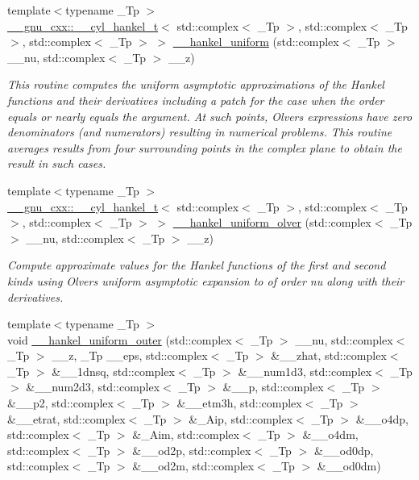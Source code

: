 \begin{DoxyCompactItemize}
{\footnotesize template$<$typename \+\_\+\+Tp $>$ }\\\hyperlink{struct____gnu__cxx_1_1____cyl__hankel__t}{\+\_\+\+\_\+gnu\+\_\+cxx\+::\+\_\+\+\_\+cyl\+\_\+hankel\+\_\+t}$<$ std\+::complex$<$ \+\_\+\+Tp $>$, std\+::complex$<$ \+\_\+\+Tp $>$, std\+::complex$<$ \+\_\+\+Tp $>$ $>$ \hyperlink{namespacestd_1_1____detail_a4de129af45576a92a42fa2b7fc2d17f3}{\+\_\+\+\_\+hankel\+\_\+uniform} (std\+::complex$<$ \+\_\+\+Tp $>$ \+\_\+\+\_\+nu, std\+::complex$<$ \+\_\+\+Tp $>$ \+\_\+\+\_\+z)
\begin{DoxyCompactList}\small\item\em This routine computes the uniform asymptotic approximations of the Hankel functions and their derivatives including a patch for the case when the order equals or nearly equals the argument. At such points, Olver\textquotesingle{}s expressions have zero denominators (and numerators) resulting in numerical problems. This routine averages results from four surrounding points in the complex plane to obtain the result in such cases. \end{DoxyCompactList}\item 
{\footnotesize template$<$typename \+\_\+\+Tp $>$ }\\\hyperlink{struct____gnu__cxx_1_1____cyl__hankel__t}{\+\_\+\+\_\+gnu\+\_\+cxx\+::\+\_\+\+\_\+cyl\+\_\+hankel\+\_\+t}$<$ std\+::complex$<$ \+\_\+\+Tp $>$, std\+::complex$<$ \+\_\+\+Tp $>$, std\+::complex$<$ \+\_\+\+Tp $>$ $>$ \hyperlink{namespacestd_1_1____detail_abbd697ee381eb2e489caa077ba7b00d9}{\+\_\+\+\_\+hankel\+\_\+uniform\+\_\+olver} (std\+::complex$<$ \+\_\+\+Tp $>$ \+\_\+\+\_\+nu, std\+::complex$<$ \+\_\+\+Tp $>$ \+\_\+\+\_\+z)
\begin{DoxyCompactList}\small\item\em Compute approximate values for the Hankel functions of the first and second kinds using Olver\textquotesingle{}s uniform asymptotic expansion to of order {\ttfamily nu} along with their derivatives. \end{DoxyCompactList}\item 
{\footnotesize template$<$typename \+\_\+\+Tp $>$ }\\void \hyperlink{namespacestd_1_1____detail_a099751f2a153283d91f19d6efa52117a}{\+\_\+\+\_\+hankel\+\_\+uniform\+\_\+outer} (std\+::complex$<$ \+\_\+\+Tp $>$ \+\_\+\+\_\+nu, std\+::complex$<$ \+\_\+\+Tp $>$ \+\_\+\+\_\+z, \+\_\+\+Tp \+\_\+\+\_\+eps, std\+::complex$<$ \+\_\+\+Tp $>$ \&\+\_\+\+\_\+zhat, std\+::complex$<$ \+\_\+\+Tp $>$ \&\+\_\+\+\_\+1dnsq, std\+::complex$<$ \+\_\+\+Tp $>$ \&\+\_\+\+\_\+num1d3, std\+::complex$<$ \+\_\+\+Tp $>$ \&\+\_\+\+\_\+num2d3, std\+::complex$<$ \+\_\+\+Tp $>$ \&\+\_\+\+\_\+p, std\+::complex$<$ \+\_\+\+Tp $>$ \&\+\_\+\+\_\+p2, std\+::complex$<$ \+\_\+\+Tp $>$ \&\+\_\+\+\_\+etm3h, std\+::complex$<$ \+\_\+\+Tp $>$ \&\+\_\+\+\_\+etrat, std\+::complex$<$ \+\_\+\+Tp $>$ \&\+\_\+\+Aip, std\+::complex$<$ \+\_\+\+Tp $>$ \&\+\_\+\+\_\+o4dp, std\+::complex$<$ \+\_\+\+Tp $>$ \&\+\_\+\+Aim, std\+::complex$<$ \+\_\+\+Tp $>$ \&\+\_\+\+\_\+o4dm, std\+::complex$<$ \+\_\+\+Tp $>$ \&\+\_\+\+\_\+od2p, std\+::complex$<$ \+\_\+\+Tp $>$ \&\+\_\+\+\_\+od0dp, std\+::complex$<$ \+\_\+\+Tp $>$ \&\+\_\+\+\_\+od2m, std\+::complex$<$ \+\_\+\+Tp $>$ \&\+\_\+\+\_\+od0dm)

\end{DoxyCompactItemize}
